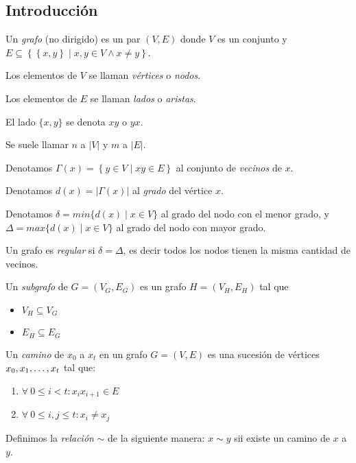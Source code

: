 \subsection{Introducción}

\begin{definition}
  Un \emph{grafo} (no dirigido) es un par $(V, E)$ donde $V$ es un conjunto y
  $E \subseteq \left\{\left\{x,y\right\} \mid x,y \in V \wedge x \neq y \right\}$.
\end{definition}

\begin{notation}
  Los elementos de $V$ se llaman \emph{vértices} o \emph{nodos}.

  Los elementos de $E$ se llaman \emph{lados} o \emph{aristas}.

  El lado $\{x,y\}$ se denota $xy$ o $yx$.

  Se suele llamar $n$ a $|V|$ y $m$ a $|E|$.

  Denotamos $\Gamma(x) = \left\{y \in V \mid xy \in E \right\}$ al conjunto de
  \emph{vecinos} de $x$.

  Denotamos $d(x) = |\Gamma(x)|$ al \emph{grado} del vértice $x$.

  Denotamos $\delta = min\{d(x) \mid x\in V\}$ al grado del nodo con el menor
  grado, y $\Delta = max\{d(x) \mid x\in V\}$ al grado del nodo con mayor grado.

\end{notation}

\begin{definition}
  Un grafo es \emph{regular} si $\delta = \Delta$, es decir todos los nodos
  tienen la misma cantidad de vecinos.
\end{definition}

\begin{definition}
  Un \emph{subgrafo} de $G = (V_G,E_G)$ es un grafo $H = (V_H,E_H)$ tal que 
  \begin{itemize}
    \item $V_H \subseteq V_G$
    \item $E_H \subseteq E_G$
  \end{itemize}
\end{definition}

\begin{definition}
Un \emph{camino} de $x_0$ a $x_t$ en un grafo $G = (V,E)$ es una sucesión de vértices $x_0, x_1, \mathellipsis, x_t$ tal que:
\begin{enumerate}
    \item $\forall~0 \le i < t\colon x_i x_{i+1} \in E$
    \item $\forall~0 \le i, j \le t\colon x_i \neq x_j$
\end{enumerate}

Definimos la \emph{relación} $\sim$ de la siguiente manera: $x \sim y$ sii existe un camino de $x$ a $y$.
\end{definition}

